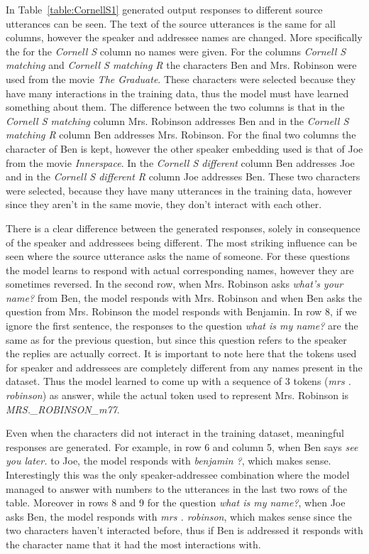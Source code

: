 \documentclass[12pt]{article}
\begin{document}
In Table~\ref{table:CornellS1} generated output responses to different source utterances can be seen. The text of the source utterances is the same for all columns, however the speaker and addressee names are changed. More specifically the for the \textit{Cornell S} column no names were given. For the columns \textit{Cornell S matching} and \textit{Cornell S matching R} the characters Ben and Mrs. Robinson were used from the movie \textit{The Graduate}. These characters were selected because they have many interactions in the training data, thus the model must have learned something about them. The difference between the two columns is that in the \textit{Cornell S matching} column Mrs. Robinson addresses Ben and in the \textit{Cornell S matching R} column Ben addresses Mrs. Robinson. For the final two columns the character of Ben is kept, however the other speaker embedding used is that of Joe from the movie \textit{Innerspace}. In the \textit{Cornell S different} column Ben addresses Joe and in the \textit{Cornell S different R} column Joe addresses Ben. These two characters were selected, because they have many utterances in the training data, however since they aren't in the same movie, they don't interact with each other.

There is a clear difference between the generated responses, solely in consequence of the speaker and addressees being different. The most striking influence can be seen where the source utterance asks the name of someone. For these questions the model learns to respond with actual corresponding names, however they are sometimes reversed. In the second row, when Mrs. Robinson asks \textit{what's your name?} from Ben, the model responds with Mrs. Robinson and when Ben asks the question from Mrs. Robinson the model responds with Benjamin. In row 8, if we ignore the first sentence, the responses to the question \textit{what is my name?} are the same as for the previous question, but since this question refers to the speaker the replies are actually correct. It is important to note here that the tokens used for speaker and addressees are completely different from any names present in the dataset. Thus the model learned to come up with a sequence of 3 tokens (\textit{mrs . robinson}) as answer, while the actual token used to represent Mrs. Robinson is \textit{MRS.\_ROBINSON\_m77}.

Even when the characters did not interact in the training dataset, meaningful responses are generated. For example, in row 6 and column 5, when Ben says \textit{see you later.} to Joe, the model responds with \textit{benjamin ?}, which makes sense. Interestingly this was the only speaker-addressee combination where the model managed to answer with numbers to the utterances in the last two rows of the table. Moreover in rows 8 and 9 for the question \textit{what is my name?}, when Joe asks Ben, the model responds with \textit{mrs . robinson}, which makes sense since the two characters haven't interacted before, thus if Ben is addressed it responds with the character name that it had the most interactions with.
\end{document}
